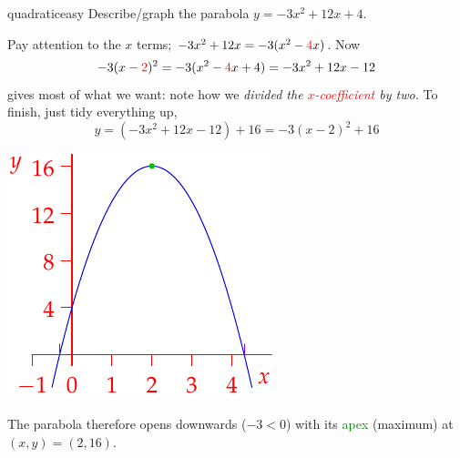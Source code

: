 \begin{example}{}{quadraticeasy}
	Describe/graph the parabola $y=-3x^2+12x+4$.\par
	\begin{minipage}[t]{0.62\linewidth}\vspace{-5pt}
		Pay attention to the $x$ terms; $-3x^2+12x=-3(x^2-\textcolor{red}{4}x)$. Now
		\[
			-3(x-\textcolor{red}{2})^2=-3(x^2-\textcolor{red}{4}x+4)=-3x^2+12x-12
		\]
		gives most of what we want: note how we \emph{divided the \textcolor{red}{$x$-coefficient} by two.} To finish, just tidy everything up,
		\[
			y=(-3x^2+12x-12)+16=-3(x-2)^2+16
		\]
	\end{minipage}
	\hfill
	\begin{minipage}[t]{0.27\linewidth}\vspace{-15pt}
		\flushright
		\includegraphics[scale=0.9]{poly-quad2}
	\end{minipage}\medbreak
	The parabola therefore opens downwards ($-3<0$) with its \textcolor{Green}{apex} (maximum) at $(x,y)=(2,16)$.
\end{example}

